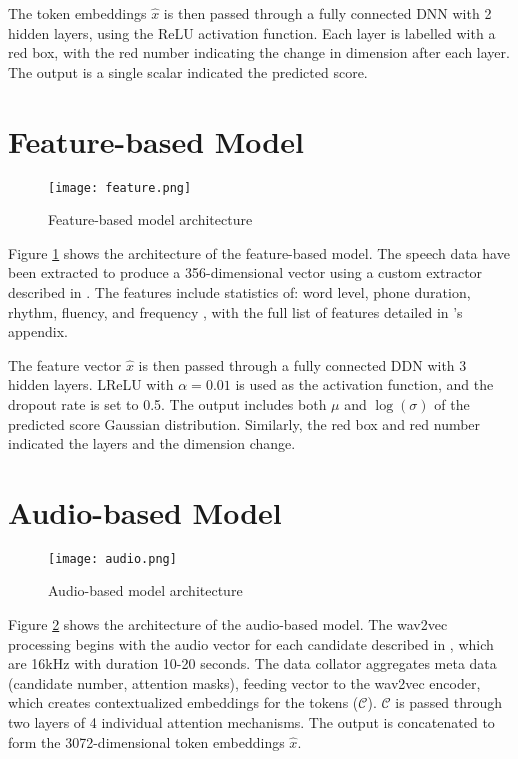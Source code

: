 The token embeddings $\hat{x}$ is then passed through a fully connected DNN with 2 hidden layers, using the ReLU activation function. Each layer is labelled with a red box, with the red number indicating the change in dimension after each layer. The output is a single scalar indicated the predicted score.

\section{Feature-based Model}
\begin{figure}[H]
    \centering
    \texttt{[image: feature.png]}
    \caption{Feature-based model architecture}
    \label{fig:feature}
\end{figure}

Figure \ref{fig:feature} shows the architecture of the feature-based model. The speech data have been extracted to produce a 356-dimensional vector using a custom extractor described in \cite{feature}. The features include statistics of: word level, phone duration, rhythm, fluency, and frequency \cite{graders}, with the full list of features detailed in \cite{feature}'s appendix.

The feature vector $\hat{x}$ is then passed through a fully connected DDN with 3 hidden layers. LReLU with $\alpha = 0.01$ is used as the activation function, and the dropout rate is set to 0.5. The output includes both $\mu$ and $\log(\sigma)$ of the predicted score Gaussian distribution. Similarly, the red box and red number indicated the layers and the dimension change.

\section{Audio-based Model}
\begin{figure}[H]
    \centering
    \texttt{[image: audio.png]}
    \caption{Audio-based model architecture}
    \label{fig:audio}
\end{figure}

Figure \ref{fig:audio} shows the architecture of the audio-based model. The wav2vec processing begins with the audio vector for each candidate described in \cite{graders}, which are 16kHz with duration 10-20 seconds. The data collator aggregates meta data (candidate number, attention masks), feeding vector to the wav2vec encoder, which creates contextualized embeddings for the tokens ($\mathcal{C}$). $\mathcal{C}$ is passed through two layers of 4 individual attention mechanisms. The output is concatenated to form the 3072-dimensional  token embeddings $\hat{x}$.

